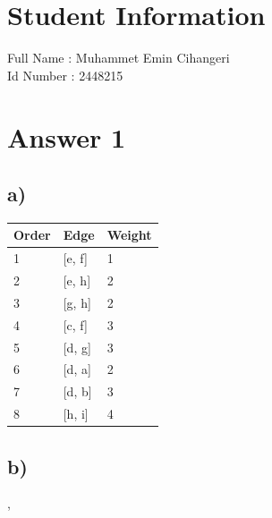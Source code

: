 \documentclass[11pt]{article}
\begin{document}
\section*{Student Information } 
Full Name : Muhammet Emin Cihangeri \\
Id Number : 2448215 \\

\section*{Answer 1}

\subsection*{a)}

\begin{table}[!ht]
    \centering
    \begin{tabular}{|l|l|l|}
    \hline
        Order & Edge & Weight \\ \hline
        1 & [e, f] & 1 \\ \hline
        2 & [e, h] & 2 \\ \hline
        3 & [g, h] & 2 \\ \hline
        4 & [c, f] & 3 \\ \hline
        5 & [d, g] & 3 \\ \hline
        6 & [d, a] & 2 \\ \hline
        7 & [d, b] & 3 \\ \hline
        8 & [h, i] & 4 \\ \hline
    \end{tabular}
\end{table}

\subsection*{b)},
\end{document}
